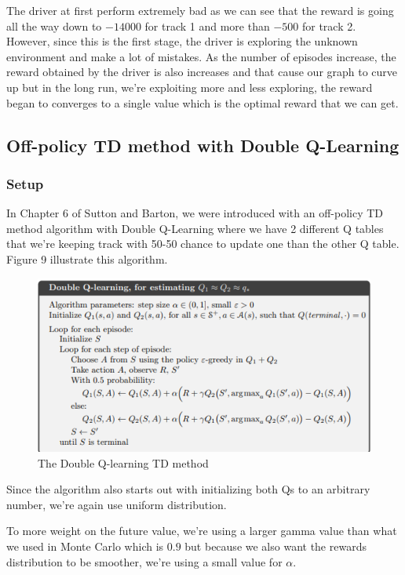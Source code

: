 \documentclass{article}
\begin{document}
The driver at first perform extremely bad as we can see that the reward is going
all the way down to $-14000$ for track 1 and more than $-500$ for track 2.
However, since this is the first stage, the driver is exploring the unknown environment
and make a lot of mistakes. As the number of episodes increase, the reward
obtained by the driver is also increases and that cause our graph to curve up
but in the long run, we're exploiting more and less exploring, the reward began
to converges to a single value which is the optimal reward that we can get.

\subsection{Off-policy TD method with Double Q-Learning}
\subsubsection{Setup}
In Chapter 6 of Sutton and Barton, we were introduced with an off-policy TD
method algorithm with Double Q-Learning where we have 2 different Q tables that we're
keeping track with 50-50 chance to update one than the other Q table. Figure 9
illustrate this algorithm.
\begin{figure}[h!]
\centering
\includegraphics[scale=0.5]{./images/double-q-td-learning.png}
\caption{The Double Q-learning TD method}
\label{fig:double-q-td-learning}
\end{figure}

Since the algorithm also starts out with initializing both Qs to an arbitrary
number, we're again use uniform distribution.

To more weight on the future value, we're using a larger gamma value than
what we used in Monte Carlo which is $0.9$ but because we also want the rewards
distribution to be smoother, we're using a small value for $\alpha$.
\end{document}
